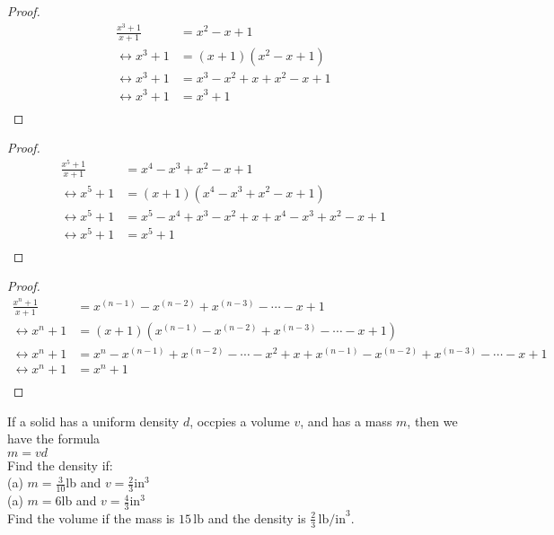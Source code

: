 \documentclass[6pt]{article}
\begin{document}
\begin{proof}
\begin{align*}
\frac{x^3 + 1}{x + 1} &= x^2 - x + 1 && \\
\leftrightarrow x^3 + 1 &= (x + 1)(x^2 - x + 1) && \\
\leftrightarrow x^3 + 1 &= x^3 - x^2 + x + x^2 - x + 1 && \\
\leftrightarrow x^3 + 1 &= x^3 + 1 && \\
\end{align*}
\end{proof}
\begin{proof}
\begin{align*}
\frac{x^5 + 1}{x + 1} &= x^4 - x^3 + x^2 - x + 1 && \\
\leftrightarrow x^5 + 1 &= (x + 1)(x^4 - x^3 + x^2 - x + 1) && \\
\leftrightarrow x^5 + 1 &= x^5 - x^4 + x^3 - x^2 + x +x^4 - x^3 + x^2 - x + 1 && \\
\leftrightarrow x^5 + 1 &= x^5 + 1 && \\
\end{align*}
\end{proof}
\begin{proof}
\begin{align*}
\frac{x^n + 1}{x + 1} &= x^{(n - 1)} - x^{(n - 2)} + x^{(n - 3)} - \cdots -x + 1 && \\
\leftrightarrow x^n + 1 &= (x + 1)(x^{(n - 1)} - x^{(n - 2)} + x^{(n - 3)} - \cdots -x + 1) && \\
\leftrightarrow x^n + 1 &= x^n - x^{(n - 1)} + x^{(n - 2)} - \cdots - x^2  + x
    + x^{(n - 1)} - x^{(n - 2)} + x^{(n - 3)} - \cdots - x + 1 && \\
    \leftrightarrow x^n + 1 &= x^n + 1&& \\
\end{align*}
\end{proof}


\begin{tcolorbox}[title=Problem 7, breakable]
If a solid has a uniform density $d$, occpies a volume $v$, and has a mass $m$,
then we have the formula \\
$m = vd$ \\
Find the density if: \\
(a) $m = \frac{3}{10}$lb and $v = \frac{2}{3}$in$^3$ \\
(a) $m = 6$lb and $v = \frac{4}{3}$in$^3$ \\
Find the volume if the mass is $15\,\text{lb}$ and the density 
is $\frac{2}{3}\,\text{lb/in}^3$.
\end{tcolorbox}
\end{document}
